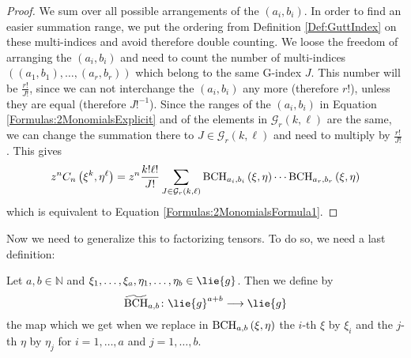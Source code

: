 \begin{proof}
    We sum over all possible arrangements of the $(a_i, b_i)$. In order 
    to find an easier summation range, we put the ordering from Definition 
    \ref{Def:GuttIndex} on these multi-indices and avoid therefore double 
    counting. We loose the freedom of arranging the $(a_i, b_i)$ and 
    need to count the number of multi-indices $((a_1, b_1), \ldots, 
    (a_r, b_r))$ which belong to the same G-index $J$. This number will 
    be $\frac{r!}{J!}$, since we can not interchange the $(a_i, b_i)$ any 
    more (therefore $r!$), unless they are equal (therefore $J!^{-1}$). 
    Since the ranges of the $(a_i, b_i)$ in Equation 
    \eqref{Formulas:2MonomialsExplicit} and of  the elements in 
    $\mathcal{G}_r(k, \ell)$ are the same, we can change the summation there 
    to $J \in \mathcal{G}_r(k, \ell)$ and need to multiply by $\frac{r!}{J!}$. 
    This gives
    \begin{equation*}
    	z^n C_n \left( \xi^k, \eta^{\ell} \right)
    	=
    	z^n \frac{k! \ell!}{J!}
    	\sum\limits_{J \in \mathcal{G}_r(k, \ell)}
    	\mathrm{BCH}_{a_i, b_i}\left(\xi, \eta\right)
        \cdots
        \mathrm{BCH}_{a_r, b_r}\left(\xi, \eta\right)
    \end{equation*}
    which is equivalent to Equation \eqref{Formulas:2MonomialsFormula1}.
\end{proof}
Now we need to generalize this to factorizing tensors. To do so, we 
need a last definition:
\begin{definition}
	\label{Def:BCHTilde}
	Let $a,b \in \mathbb{N}$ and $\xi_1, \ldots, \xi_a, \eta_1, \ldots, 
	\eta_b \in \lie{g}$. Then we define by
	\begin{equation*}
		\widetilde{\mathrm{BCH}}_{a,b}
		\colon
		\lie{g}^{a + b}
		\longrightarrow
		\lie{g}
	\end{equation*}
	the map which we get when we replace in $\mathrm{BCH}_{a, b}\left(\xi, \eta\right)$ 
	the $i$-th $\xi$ by $\xi_i$ and the $j$-th $\eta$ by $\eta_j$
	for $i = 1, \ldots, a$ and $j = 1, \ldots, b$.
\end{definition}
